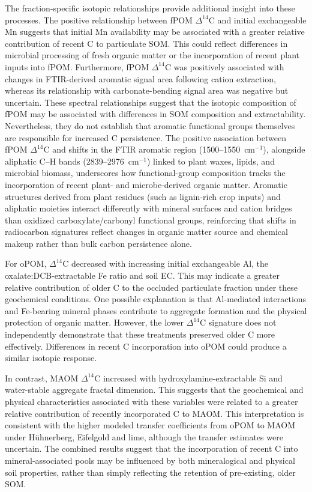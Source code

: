 \documentclass[preprint,12pt]{elsarticle}
\begin{document}
The fraction-specific isotopic relationships provide additional insight into these processes. The positive relationship between fPOM $\Delta^{14}$C and initial exchangeable Mn suggests that initial Mn availability may be associated with a greater relative contribution of recent C to particulate SOM. This could reflect differences in microbial processing of fresh organic matter or the incorporation of recent plant inputs into fPOM. Furthermore, fPOM $\Delta^{14}$C was positively associated with changes in FTIR-derived aromatic signal area following cation extraction, whereas its relationship with carbonate-bending signal area was negative but uncertain. These spectral relationships suggest that the isotopic composition of fPOM may be associated with differences in SOM composition and extractability. Nevertheless, they do not establish that aromatic functional groups themselves are responsible for increased C persistence. The positive association between fPOM $\Delta^{14}\text{C}$ and shifts in the FTIR aromatic region (1500--1550~cm$^{-1}$), alongside aliphatic C--H bands (2839--2976~cm$^{-1}$) linked to plant waxes, lipids, and microbial biomass, underscores how functional-group composition tracks the incorporation of recent plant- and microbe-derived organic matter. Aromatic structures derived from plant residues (such as lignin-rich crop inputs) and aliphatic moieties interact differently with mineral surfaces and cation bridges than oxidized carboxylate/carbonyl functional groups, reinforcing that shifts in radiocarbon signatures reflect changes in organic matter source and chemical makeup rather than bulk carbon persistence alone.

For oPOM, $\Delta^{14}$C decreased with increasing initial exchangeable Al, the oxalate:DCB-extractable Fe ratio and soil EC. This may indicate a greater relative contribution of older C to the occluded particulate fraction under these geochemical conditions. One possible explanation is that Al-mediated interactions and Fe-bearing mineral phases contribute to aggregate formation and the physical protection of organic matter. However, the lower $\Delta^{14}$C signature does not independently demonstrate that these treatments preserved older C more effectively. Differences in recent C incorporation into oPOM could produce a similar isotopic response.

In contrast, MAOM $\Delta^{14}$C increased with hydroxylamine-extractable Si and water-stable aggregate fractal dimension. This suggests that the geochemical and physical characteristics associated with these variables were related to a greater relative contribution of recently incorporated C to MAOM. This interpretation is consistent with the higher modeled transfer coefficients from oPOM to MAOM under Hühnerberg, Eifelgold and lime, although the transfer estimates were uncertain. The combined results suggest that the incorporation of recent C into mineral-associated pools may be influenced by both mineralogical and physical soil properties, rather than simply reflecting the retention of pre-existing, older SOM.
\end{document}
